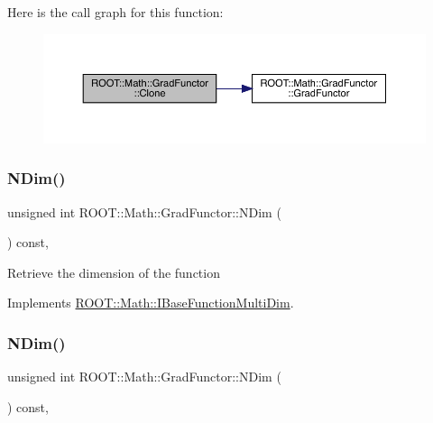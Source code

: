 Here is the call graph for this function\+:
\nopagebreak
\begin{figure}[H]
\begin{center}
\leavevmode
\includegraphics[width=350pt]{de/d74/classROOT_1_1Math_1_1GradFunctor_a21093c0d3001069e49ce6278b5a32a40_cgraph}
\end{center}
\end{figure}
\mbox{\label{classROOT_1_1Math_1_1GradFunctor_a7ff4ed4ad6f7c17d74403a443990f069}} 
\subsubsection{\texorpdfstring{NDim()}{NDim()}\hspace{0.1cm}{\footnotesize\ttfamily [1/3]}}
{\footnotesize\ttfamily unsigned int R\+O\+O\+T\+::\+Math\+::\+Grad\+Functor\+::\+N\+Dim (\begin{DoxyParamCaption}{ }\end{DoxyParamCaption}) const\hspace{0.3cm}{\ttfamily [inline]}, {\ttfamily [virtual]}}

Retrieve the dimension of the function 

Implements \mbox{\hyperlink{classROOT_1_1Math_1_1IBaseFunctionMultiDim_a16f37dc7a6d00c75ddeda0697741315d}{R\+O\+O\+T\+::\+Math\+::\+I\+Base\+Function\+Multi\+Dim}}.

\mbox{\label{classROOT_1_1Math_1_1GradFunctor_a7ff4ed4ad6f7c17d74403a443990f069}} 
\subsubsection{\texorpdfstring{NDim()}{NDim()}\hspace{0.1cm}{\footnotesize\ttfamily [2/3]}}
{\footnotesize\ttfamily unsigned int R\+O\+O\+T\+::\+Math\+::\+Grad\+Functor\+::\+N\+Dim (\begin{DoxyParamCaption}{ }\end{DoxyParamCaption}) const\hspace{0.3cm}{\ttfamily [inline]}, {\ttfamily [virtual]}}

